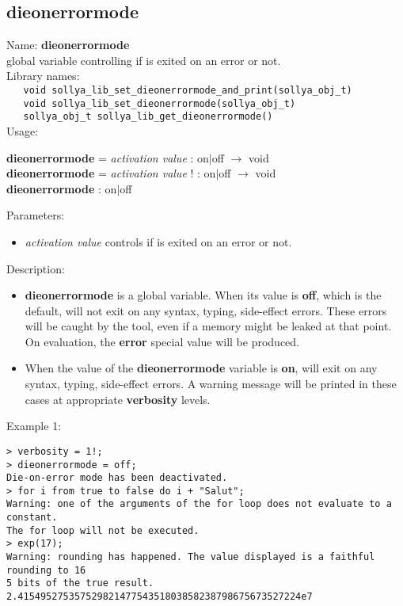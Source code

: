 \subsection{dieonerrormode}
\label{labdieonerrormode}
\noindent Name: \textbf{dieonerrormode}\\
\phantom{aaa}global variable controlling if \sollya is exited on an error or not.\\[0.2cm]
\noindent Library names:\\
\verb|   void sollya_lib_set_dieonerrormode_and_print(sollya_obj_t)|\\
\verb|   void sollya_lib_set_dieonerrormode(sollya_obj_t)|\\
\verb|   sollya_obj_t sollya_lib_get_dieonerrormode()|\\[0.2cm]
\noindent Usage: 
\begin{center}
\textbf{dieonerrormode} = \emph{activation value} : \textsf{on$|$off} $\rightarrow$ \textsf{void}\\
\textbf{dieonerrormode} = \emph{activation value} ! : \textsf{on$|$off} $\rightarrow$ \textsf{void}\\
\textbf{dieonerrormode} : \textsf{on$|$off}\\
\end{center}
Parameters: 
\begin{itemize}
\item \emph{activation value} controls if \sollya is exited on an error or not.
\end{itemize}
\noindent Description: \begin{itemize}

\item \textbf{dieonerrormode} is a global variable. When its value is \textbf{off}, which is the default,
   \sollya will not exit on any syntax, typing, side-effect errors. These
   errors will be caught by the tool, even if a memory might be leaked at 
   that point. On evaluation, the \textbf{error} special value will be produced.

\item When the value of the \textbf{dieonerrormode} variable is \textbf{on}, \sollya will exit
   on any syntax, typing, side-effect errors. A warning message will
   be printed in these cases at appropriate \textbf{verbosity} levels. 
\end{itemize}
\noindent Example 1: 
\begin{center}\begin{minipage}{15cm}\begin{Verbatim}[frame=single]
> verbosity = 1!;
> dieonerrormode = off;
Die-on-error mode has been deactivated.
> for i from true to false do i + "Salut";
Warning: one of the arguments of the for loop does not evaluate to a constant.
The for loop will not be executed.
> exp(17);
Warning: rounding has happened. The value displayed is a faithful rounding to 16
5 bits of the true result.
2.41549527535752982147754351803858238798675673527224e7
\end{Verbatim}
\end{minipage}\end{center}
